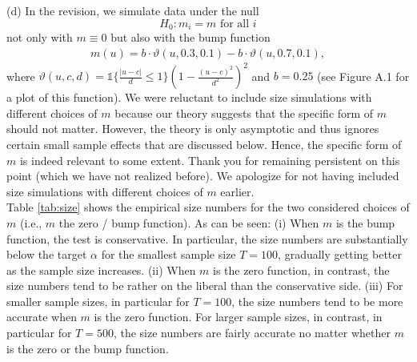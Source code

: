 \documentclass[a4paper,12pt]{article}
\newcommand{\ind}{\mathbb{1}}
\begin{document}
\begin{enumerate}[label=\arabic*.,leftmargin=0.6cm]
(d) In the revision, we simulate data under the null 
\[ H_0: m_i = m \text{ for all } i \]
not only with $m \equiv 0$ but also with the bump function 
\begin{align*}
m(u) =  b \cdot  \vartheta(u, 0.3, 0.1) - b  \cdot  \vartheta(u,0.7, 0.1), 
\end{align*}
where $\vartheta(u,c,d) =  \ind \{\frac{|u - c|}{d}\leq 1 \} (1 - \frac{(u - c)^2}{d^2})^2$ and $b = 0.25$ (see Figure A.1 for a plot of this function). 
We were reluctant to include size simulations with different choices of $m$ because our theory suggests that the specific form of $m$ should not matter. However, 
the theory is only asymptotic and thus ignores certain small sample effects that are discussed below. Hence, the specific form of $m$ is indeed relevant to some extent. Thank you for remaining persistent on this point (which we have not realized before). We apologize for not having included size simulations with different choices of $m$ earlier. \\
Table \ref{tab:size} shows the empirical size numbers for the two considered choices of $m$ (i.e., $m$ the zero / bump function). 
As can be seen: (i) When $m$ is the bump function, the test is conservative. In particular, the size numbers are substantially below the target $\alpha$ for the smallest sample size $T=100$, gradually getting better as the sample size increases. (ii) When $m$ is the zero function, in contrast, the size numbers tend to be rather on the liberal than the conservative side. (iii) For smaller sample sizes, in particular for $T=100$, the size numbers tend to be more accurate when $m$ is the zero function. For larger sample sizes, in contrast, in particular for $T=500$, the size numbers are fairly accurate no matter whether $m$ is the zero or the bump function. 

\end{enumerate}
\end{document}
